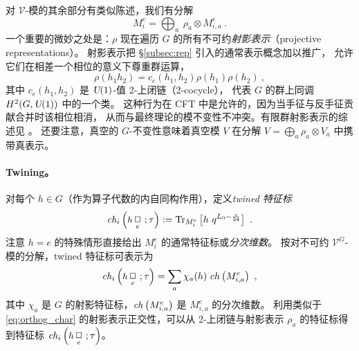 \documentclass[11pt,a4paper,fontset=windows]{ctexart}
\numberwithin{equation}{section}
\newcommand{\UU}{\operatorname{\textsl{U}}}      %
\newcommand{\myparagraph}[1]{\paragraph{#1}\mbox\\}
\def\rr{\rho}
\def\t{\tau}
\newcommand{\tr}{\operatorname{Tr}}
\begin{document}

对 $\mathcal{V}$-模的其余部分有类似陈述，我们有分解
\begin{equation}
M_i^e=\bigoplus_a~\rr_a\otimes M_{i,a}^e~.
\end{equation}
一个重要的微妙之处是：$\rr$ 现在遍历 $G$ 的所有不可约\emph{射影表示}（projective representations）。
射影表示把 \S\ref{subsec:rep} 引入的通常表示概念加以推广，
允许它们在相差一个相位的意义下尊重群运算，
\begin{equation}
\label{cocycles}
\rr(h_1h_2)=c_e(h_1,h_2)\rr(h_1)\rr(h_2)~,
\end{equation}
其中 $c_e(h_1,h_2)$ 是 $\UU(1)$-值 2-上闭链（2-cocycle），
代表 $G$ 的群上同调 $H^2(G,\UU(1))$ 中的一个类。
这种行为在 CFT 中是允许的，因为当手征与反手征贡献合并时该相位相消，
从而与最终理论的模不变性不冲突。有限群射影表示的综述见 \cite{Tania-LuminiţaCostache2009Oipr}。
还要注意，真空的 $G$-不变性意味着真空模 $V$ 在分解
$V=\bigoplus_a \rho_a\otimes V_a$ 中携带真表示。


\myparagraph{Twining。}
对每个 $h\in G$（作为算子代数的内自同构作用），定义\emph{twined 特征标}
\begin{equation}
\label{eq:twined_char}
{\it ch}_i\left(\mbox{\fontsize{9}{10}\selectfont $h\,$}\underset{e}{\Box}~;\t\right) :=\tr_{M^e_i}\left[h~q^{L_0-\frac{c}{24}}\right]~.
\end{equation}
注意 $h=e$ 的特殊情形直接给出 $M_i^e$ 的通常特征标或\emph{分次维数}。
按对不可约 $\mathcal{V}^G$-模的分解，twined 特征标可表示为
\begin{equation}
\label{eq:twined_chars}
{\it ch}_i\left(\mbox{\fontsize{9}{10}\selectfont $h\,$}\underset{e}{\Box}~;\t\right)=\sum_a\chi_{a}(h)~ ch\left(M_{i,a}^e\right)~,
\end{equation}
其中 $\chi_a$ 是 $G$ 的射影特征标，${\it ch}\left(M_{i,a}^e\right)$ 是 $M_{i,a}^e$ 的分次维数。
利用类似于 \eqref{eq:orthog_char} 的射影表示正交性，可以从 2-上闭链与射影表示 $\rho_a$
的特征标得到特征标 ${\it ch}_i\left(\mbox{\fontsize{9}{10}\selectfont $h\,$}\underset{e}{\Box}~;\t\right)$。
\end{document}
